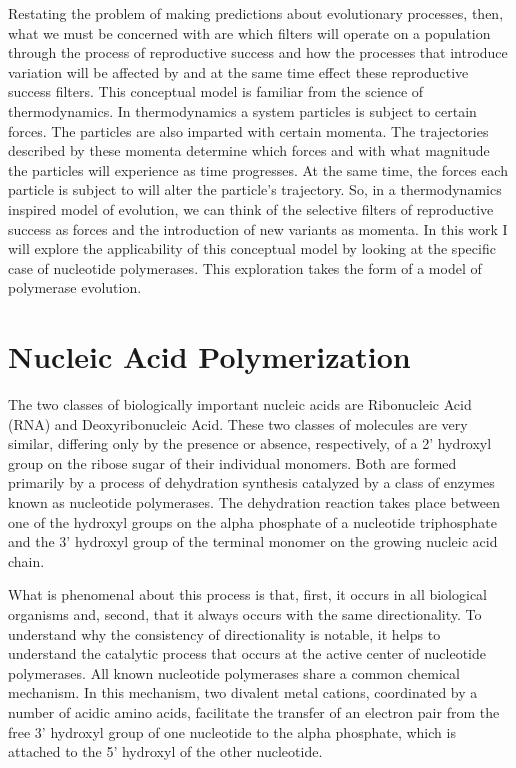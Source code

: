 Restating the problem of making predictions about evolutionary processes, then, what we must be concerned with are which filters will operate on a population through the process of reproductive success and how the processes that introduce variation will be affected by and at the same time effect these reproductive success filters. This conceptual model is familiar from the science of thermodynamics. In thermodynamics a system particles is subject to certain forces. The particles are also imparted with certain momenta. The trajectories described by these momenta determine which forces and with what magnitude the particles will experience as time progresses. At the same time, the forces each particle is subject to will alter the particle's trajectory. So, in a thermodynamics inspired model of evolution, we can think of the selective filters of reproductive success as forces and the introduction of new variants as momenta. In this work I will explore the applicability of this conceptual model by looking at the specific case of nucleotide polymerases. This exploration takes the form of a model of polymerase evolution.

\section*{Nucleic Acid Polymerization} %
\label{sec:nucleotide_polymerization}
The two classes of biologically important nucleic acids are Ribonucleic Acid (RNA) and Deoxyribonucleic Acid. These two classes of molecules are very similar, differing only by the presence or absence, respectively, of a 2' hydroxyl group on the ribose sugar of their individual monomers. Both are formed primarily by a process of dehydration synthesis catalyzed by a class of enzymes known as nucleotide polymerases. The dehydration reaction takes place between one of the hydroxyl groups on the alpha phosphate of a nucleotide triphosphate and the 3' hydroxyl group of the terminal monomer on the growing nucleic acid chain.

What is phenomenal about this process is that, first, it occurs in all biological organisms and, second, that it always occurs with the same directionality. To understand why the consistency of directionality is notable, it helps to understand the catalytic process that occurs at the active center of nucleotide polymerases. All known nucleotide polymerases share a common chemical mechanism. In this mechanism, two divalent metal cations, coordinated by a number of acidic amino acids, facilitate the transfer of an electron pair from the free 3' hydroxyl group of one nucleotide to the alpha phosphate, which is attached to the 5' hydroxyl of the other nucleotide.

